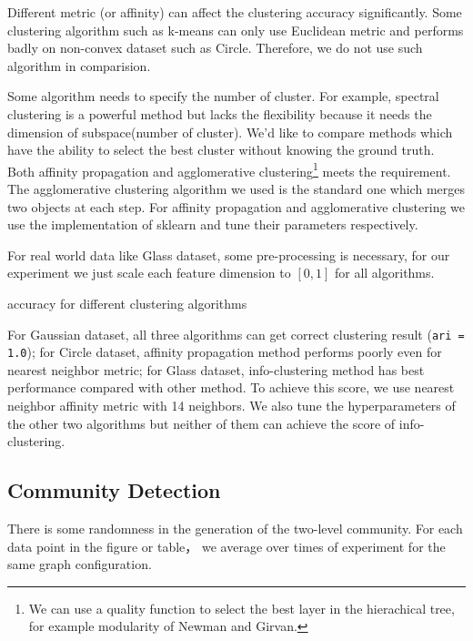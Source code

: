 \documentclass{article}
\begin{document}
Different metric (or affinity) can affect the clustering accuracy significantly. Some clustering algorithm such as \textsf{k-means} can only use Euclidean metric and performs badly on non-convex dataset such as \textsf{Circle}. Therefore, we do not use such algorithm in comparision. 

Some algorithm needs to specify the number of cluster.  For example, spectral clustering is a powerful method but lacks the flexibility because it needs the dimension of subspace(number of cluster).  We'd like to compare methods which have the ability to select the best cluster without knowing the ground truth. Both \textsf{affinity propagation} and \textsf{agglomerative clustering}\footnote{We can use a quality function to select the best layer in the hierachical tree, for example modularity of Newman and Girvan.} meets the requirement. The agglomerative clustering algorithm we used is the standard one which merges two objects at each step. For \textsf{affinity propagation} and \textsf{agglomerative clustering} we use the implementation of \textsf{sklearn} and tune their parameters respectively.

For real world data like Glass dataset, some pre-processing is necessary, for our experiment we just scale each feature dimension to $[0, 1]$ for all algorithms.

\begin{table}
\centering
{}
\caption{ accuracy for different clustering algorithms }\label{tb:e1}
\end{table}

For \textsf{Gaussian} dataset, all three algorithms can get correct clustering result (\texttt{ari = 1.0}); for \textsf{Circle} dataset, affinity propagation method performs poorly even for nearest neighbor metric; for \textsf{Glass} dataset, info-clustering method has best performance compared with other method. To achieve this score, we use nearest neighbor affinity metric with 14 neighbors. We also tune the hyperparameters of the other two algorithms but neither of them can achieve the score of info-clustering.
\subsection{Community Detection}
There is some randomness in the generation of the two-level community. For each data point in the figure or table， we average over times of experiment for the same graph configuration.


\end{document}
